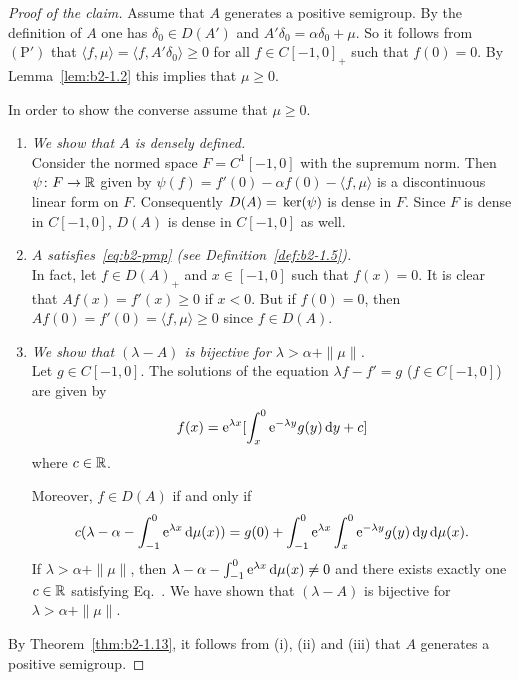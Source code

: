 \begin{proof}[Proof of the claim]
Assume that $A$ generates a positive semigroup.
By the definition of\/ $A$ one has $\delta_{0} \in D(A')$ and $A'\delta_{0} = \alpha\delta_{0} + \mu$.
So it follows from $(\mathrm{P}')$ that $\langle f,\mu \rangle = \langle f,A'\delta_{0} \rangle \geq 0$ for all $f \in C[-1,0]_{+}$ such that $f(0) = 0$.
By Lemma~\ref{lem:b2-1.2}
this implies that $\mu \geq 0$.

In order to show the converse assume that $\mu \geq 0$.
\begin{enumerate}[\upshape(i), wide, labelindent=.25em]

\item
\textit{We show that $A$ is densely defined.}\\
Consider the normed space $F = C^{1}[-1,0]$ with the supremum norm.
Then $\psi \colon F \to \mathbb{R}$ given by 
$\psi(f) = f'(0) - \alpha f(0) - \langle f,\mu \rangle$ 
is a discontinuous linear form on $F$.
Consequently $D(A) = \mathop{}\mathrm{ker}(\psi)$ is dense in $F$.
Since $F$ is dense in $C[-1,0]$, $D(A)$ is dense in $C[-1,0]$ as well.

\item
\textit{$A$ satisfies~\eqref{eq:b2-pmp} (see Definition~\ref{def:b2-1.5}).}\\
In fact, let $f \in D(A)_{+}$ and $x \in [-1,0]$ such that $f(x) = 0$.
It is clear that $Af(x) = f'(x) \geq 0$ if\/ $x < 0$.
But if\/ $f(0) = 0$, then $Af(0) = f'(0) = \langle f,\mu \rangle \geq 0$ since $f \in D(A)$.

\item
\textit{We show that $(\lambda-A)$ is bijective for $\lambda > \alpha + \|\mu\|$.}\\
Let $g \in C[-1,0]$.
The solutions of the equation $\lambda f - f' = g$ ($f \in C[-1,0]$) are given by 
%
\[
	f(x) = \mathrm{e}^{\lambda x}[\int_{x}^{0} \mathrm{e}^{-\lambda y} g(y) \mathop{}\!\mathrm{d}{y} + c] 
\]
%
where $c \in \mathbb{R}$.

Moreover, $f \in D(A)$ if and only if
\begin{equation}\label{eq:b2-1.13}
c(\lambda - \alpha - \int_{-1}^{0} \mathrm{e}^{\lambda x} \mathop{}\!\mathrm{d}{\mu(x)}) = g(0) + \int_{-1}^{0} \mathrm{e}^{\lambda x} \int_{x}^{0}\mathrm{e}^{-\lambda y} g(y) \mathop{}\!\mathrm{d}{y}\mathop{}\!\mathrm{d}{\mu(x)}.
\end{equation}
If\/ $\lambda > \alpha + \|\mu\|$, then $\lambda - \alpha - \int_{-1}^{0} \mathrm{e}^{\lambda x} \mathop{}\!\mathrm{d}{\mu(x)} \neq 0$ and there exists exactly one $c \in \mathbb{R}$ satisfying Eq.~.
We have shown that $(\lambda- A)$ is bijective for $\lambda > \alpha + \|\mu\|$.

\end{enumerate}
By Theorem~\ref{thm:b2-1.13}, it follows from \upshape(i), \upshape(ii) and \upshape(iii) that $A$ generates a positive semigroup.
\end{proof}
